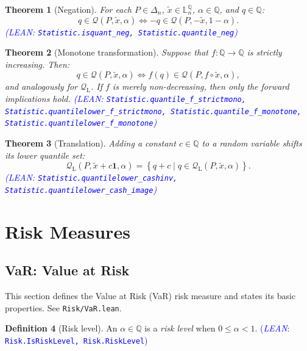 \documentclass[letterpaper]{article}
\theoremstyle{plain}
\newtheorem{theorem}{Theorem}[subsection]
\theoremstyle{definition}
\newtheorem{definition}[theorem]{Definition}
\theoremstyle{remark}
\newcommand{\lean}[1]{\textcolor{blue}{(\emph{LEAN}: \texttt{#1})}}
\newcommand{\leanok}{}
\begin{document}
\begin{theorem}[Negation] \label{thm:quantile-neg}
For each $P\in \Delta_n$, $\tilde{x}\in \mathbb{L}_n^{\mathbb{Q}}$, $\alpha\in \mathbb{Q}$, and $q\in \mathbb{Q}$:
\[
  q \in \mathcal{Q}(P, \tilde{x}, \alpha)
  \iff
  -q \in \mathcal{Q}(P, -\tilde{x}, 1-\alpha).
\]
\lean{Statistic.isquant\_neg, Statistic.quantile\_neg} \leanok
\end{theorem}

\begin{theorem}[Monotone transformation] \label{thm:quantile-strictmono}
Suppose that $f\colon \mathbb{Q} \to \mathbb{Q}$ is strictly increasing. Then:
\[
  q \in \mathcal{Q}(P, \tilde{x}, \alpha)
  \iff
  f(q) \in \mathcal{Q}(P, f \circ \tilde{x}, \alpha),
\]
and analogously for $\mathcal{Q}_{\mathrm{L}}$. If $f$ is merely non-decreasing, then only the forward implications hold.
\lean{Statistic.quantile\_f\_strictmono, Statistic.quantilelower\_f\_strictmono, Statistic.quantile\_f\_monotone, Statistic.quantilelower\_f\_monotone} \leanok
\end{theorem}

\begin{theorem}[Translation] \label{thm:quantilelower-cash}
Adding a constant $c\in \mathbb{Q}$ to a random variable shifts its lower quantile set:
\[
  \mathcal{Q}_{\mathrm{L}}(P, \tilde{x} + c \bm{1}, \alpha)
  =
  \left\{ q + c \mid q \in \mathcal{Q}_{\mathrm{L}}(P, \tilde{x}, \alpha) \right\}.
\]
\lean{Statistic.quantilelower\_cashinv, Statistic.quantilelower\_cash\_image} \leanok
\end{theorem}

\section{Risk Measures}

\subsection{VaR: Value at Risk}

This section defines the Value at Risk (VaR) risk measure and states its basic properties. See \texttt{Risk/VaR.lean}.

\begin{definition}[Risk level] \label{def:risk-level}
An $\alpha \in \mathbb{Q}$ is a \emph{risk level} when $0 \le \alpha < 1$.
\lean{Risk.IsRiskLevel, Risk.RiskLevel} \leanok
\end{definition}
\end{document}
